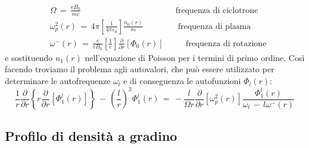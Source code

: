 \begin{align}
    & \Omega\,=\,\frac{eB_0}{mc} \qquad \qquad \qquad \qquad \qquad \,\,\,\,\,\,\,\, \text{frequenza di ciclotrone}\\
    & \omega_p^2\left(r\right)\,=\,4\pi\left[\frac{1}{4\pi\varepsilon_0}\right]\frac{n_0\left(r\right)}{m} \, \qquad \qquad \text{frequenza di plasma} \\
    & \omega^-\left(r\right)\,=\,\frac{c}{rB_0}\left[\frac{1}{c}\right]\frac{\partial}{\partial r}\left[\Phi_0\left(r\right)\right] \qquad \,\,\,\, \text{frequenza di rotazione}
\end{align}
e sostituendo $n_1\left(r\right)$ nell'equazione di Poisson per i termini di primo ordine.
Così facendo troviamo il problema agli autovalori, che può essere utilizzato per determinare le autofrequenze $\omega_l$ e di conseguenza 
le autofunzioni $\Phi_l\left(r\right)$:
\begin{equation}
    \frac{1}{r}\frac{\partial}{\partial r}\left\{r\frac{\partial}{\partial r}\left[\Phi^l_1\left(r\right)\right]\right\}\,-\,\left(\frac{l}{r}\right)^2\Phi_1^l\left(r\right)\,=\,-\frac{l}{\Omega r}\frac{\partial}{\partial r}\left[\omega_p^2\left(r\right)\right]\frac{\Phi_1^l\left(r\right)}{\omega_l\,-\,l\omega^-\left(r\right)}
    \label{equation: problema_autovalori}
\end{equation}

\subsection{Profilo di densità a gradino}

